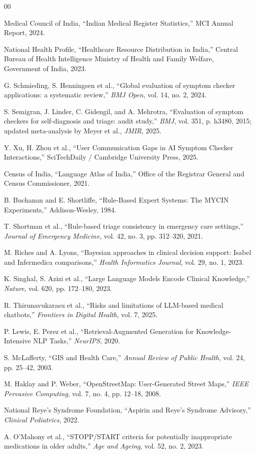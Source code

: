 \documentclass[conference]{IEEEtran}
\begin{document}
\begin{thebibliography}{00}

 Medical Council of India, ``Indian Medical Register Statistics,'' MCI Annual Report, 2024.

 National Health Profile, ``Healthcare Resource Distribution in India,'' Central Bureau of Health Intelligence Ministry of Health and Family Welfare, Government of India, 2023.

 G. Schmieding, S. Henningsen et al., ``Global evaluation of symptom checker applications: a systematic review,'' \textit{BMJ Open}, vol. 14, no. 2, 2024.

 S. Semigran, J. Linder, C. Gidengil, and A. Mehrotra, ``Evaluation of symptom checkers for self-diagnosis and triage: audit study,'' \textit{BMJ}, vol. 351, p. h3480, 2015; updated meta-analysis by Meyer et al., \textit{JMIR}, 2025.

 Y. Xu, H. Zhou et al., ``User Communication Gaps in AI Symptom Checker Interactions,'' SciTechDaily / Cambridge University Press, 2025.

 Census of India, ``Language Atlas of India,'' Office of the Registrar General and Census Commissioner, 2021.

 B. Buchanan and E. Shortliffe, ``Rule-Based Expert Systems: The MYCIN Experiments,'' Addison-Wesley, 1984.

 T. Shortman et al., ``Rule-based triage consistency in emergency care settings,'' \textit{Journal of Emergency Medicine}, vol. 42, no. 3, pp. 312--320, 2021.

 M. Riches and A. Lyons, ``Bayesian approaches in clinical decision support: Isabel and Infermedica comparisons,'' \textit{Health Informatics Journal}, vol. 29, no. 1, 2023.

 K. Singhal, S. Azizi et al., ``Large Language Models Encode Clinical Knowledge,'' \textit{Nature}, vol. 620, pp. 172--180, 2023.

 R. Thirunavukarasu et al., ``Risks and limitations of LLM-based medical chatbots,'' \textit{Frontiers in Digital Health}, vol. 7, 2025.

 P. Lewis, E. Perez et al., ``Retrieval-Augmented Generation for Knowledge-Intensive NLP Tasks,'' \textit{NeurIPS}, 2020.

 S. McLafferty, ``GIS and Health Care,'' \textit{Annual Review of Public Health}, vol. 24, pp. 25--42, 2003.

 M. Haklay and P. Weber, ``OpenStreetMap: User-Generated Street Maps,'' \textit{IEEE Pervasive Computing}, vol. 7, no. 4, pp. 12--18, 2008.

 National Reye's Syndrome Foundation, ``Aspirin and Reye's Syndrome Advisory,'' \textit{Clinical Pediatrics}, 2022.

 A. O'Mahony et al., ``STOPP/START criteria for potentially inappropriate medications in older adults,'' \textit{Age and Ageing}, vol. 52, no. 2, 2023.

\end{thebibliography}
\end{document}

